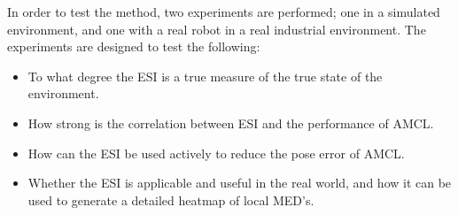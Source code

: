 In order to test the method, two experiments are performed; one in a simulated environment, and one with a real robot in a real industrial environment.
The experiments are designed to test the following:

\begin{itemize}
\item To what degree the ESI is a true measure of the true state of the environment.
\item How strong is the correlation between ESI and the performance of AMCL.
\item How can the ESI be used actively to reduce the pose error of AMCL.
\item Whether the ESI is applicable and useful in the real world, and how it can be used to generate a detailed heatmap of local MED's.
\end{itemize}


